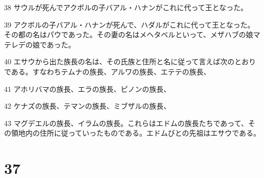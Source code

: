 \par 38 サウルが死んでアクボルの子バアル・ハナンがこれに代って王となった。
\par 39 アクボルの子バアル・ハナンが死んで、ハダルがこれに代って王となった。その都の名はパウであった。その妻の名はメヘタベルといって、メザハブの娘マテレデの娘であった。
\par 40 エサウから出た族長の名は、その氏族と住所と名に従って言えば次のとおりである。すなわちテムナの族長、アルワの族長、エテテの族長、
\par 41 アホリバマの族長、エラの族長、ピノンの族長、
\par 42 ケナズの族長、テマンの族長、ミブザルの族長、
\par 43 マグデエルの族長、イラムの族長。これらはエドムの族長たちであって、その領地内の住所に従っていったものである。エドムびとの先祖はエサウである。

\chapter{37}

